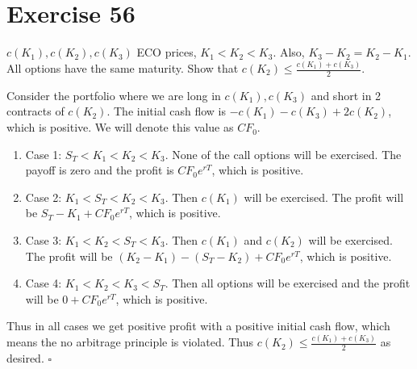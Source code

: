 \documentclass{article}
\begin{document}
\section*{Exercise 56}
$c(K_1), c(K_2), c(K_3)$ ECO prices, $K_1 < K_2 < K_3$. Also, $K_3 - K_2 = K_2 - K_1$. All options have the same maturity. Show that $c(K_2) \leq \frac{c(K_1) + c(K_3)}{2}$.
\begin{flushleft}
    Consider the portfolio where we are long in $c(K_1), c(K_3)$ and short in 2 contracts of $c(K_2)$. The initial cash flow is $-c(K_1) - c(K_3) + 2c(K_2)$, which is positive. We will denote this value as $CF_0$.
    \begin{enumerate}
        \item Case 1: $S_T < K_1 < K_2 < K_3$. None of the call options will be exercised. The payoff is zero and the profit is $CF_0e^{rT}$, which is positive.
        \item Case 2: $K_1 < S_T < K_2 < K_3$. Then $c(K_1)$ will be exercised. The profit will be $S_T - K_1 + CF_0e^{rT}$, which is positive.
        \item Case 3: $K_1 < K_2 < S_T < K_3$. Then $c(K_1)$ and $c(K_2)$ will be exercised. The profit will be $(K_2 - K_1) - (S_T - K_2) + CF_0e^{rT}$, which is positive.
        \item Case 4: $K_1 < K_2 < K_3 < S_T$. Then all options will be exercised and the profit will be $0 + CF_0e^{rT}$, which is positive.
    \end{enumerate}
    Thus in all cases we get positive profit with a positive initial cash flow, which means the no arbitrage principle is violated. Thus $c(K_2) \leq \frac{c(K_1) + c(K_3)}{2}$ as desired. $\square$
\end{flushleft}
\end{document}
